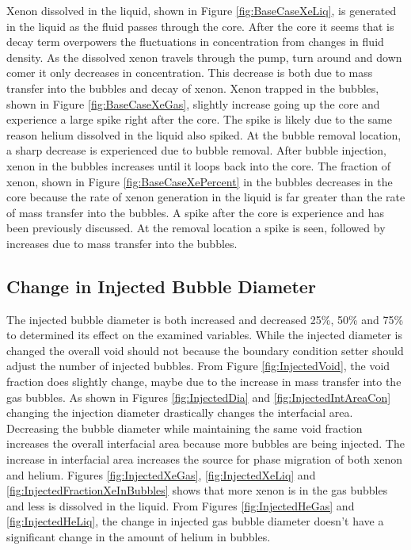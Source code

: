Xenon dissolved in the liquid, shown in Figure \ref{fig:BaseCaseXeLiq}, is generated in the liquid as the fluid passes through the core. After the core it seems that is decay term overpowers the fluctuations in concentration from changes in fluid density. As the dissolved xenon travels through the pump, turn around and down comer it only decreases in concentration. This decrease is both due to mass transfer into the bubbles and decay of xenon. Xenon trapped in the bubbles, shown in Figure \ref{fig:BaseCaseXeGas}, slightly increase going up the core and experience a large spike right after the core. The spike is likely due to the same reason helium dissolved in the liquid also spiked. At the bubble removal location, a sharp decrease is experienced due to bubble removal. After bubble injection, xenon in the bubbles increases until it loops back into the core. The fraction of xenon, shown in Figure \ref{fig:BaseCaseXePercent} in the bubbles decreases in the core because the rate of xenon generation in the liquid is far greater than the rate of mass transfer into the bubbles. A spike after the core is experience and has been previously discussed. At the removal location a spike is seen, followed by increases due to mass transfer into the bubbles. 

\subsection{Change in Injected Bubble Diameter}
The injected bubble diameter is both increased and decreased 25\%, 50\% and 75\% to determined its effect on the examined variables. While the injected diameter is changed the overall void should not because the boundary condition setter should adjust the number of injected bubbles. From Figure \ref{fig:InjectedVoid}, the void fraction does slightly change, maybe due to the increase in mass transfer into the gas bubbles. As shown in Figures \ref{fig:InjectedDia} and \ref{fig:InjectedIntAreaCon} changing the injection diameter drastically changes the interfacial area. Decreasing the bubble diameter while maintaining the same void fraction increases the overall interfacial area because more bubbles are being injected. The increase in interfacial area increases the source for phase migration of both xenon and helium. Figures \ref{fig:InjectedXeGas}, \ref{fig:InjectedXeLiq} and \ref{fig:InjectedFractionXeInBubbles} shows that more xenon is in the gas bubbles and less is dissolved in the liquid. From Figures \ref{fig:InjectedHeGas} and \ref{fig:InjectedHeLiq}, the change in injected gas bubble diameter doesn't have a significant change in the amount of helium in bubbles.

